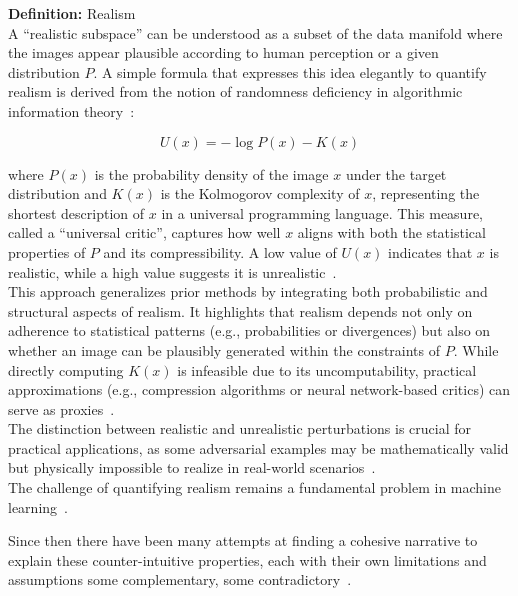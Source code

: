 \documentclass[a4paper, oneside]{discothesis}
\begin{document}
\begin{highlightbox}
	\textbf{Definition:} Realism  \\

	A ``realistic subspace'' can be understood as a subset of the data manifold where the images appear plausible according to human perception or a given distribution $P$. A simple formula that expresses this idea elegantly to quantify realism is derived from the notion of randomness deficiency in algorithmic information theory~\cite{theis2024makes}:

	$$U(x) = -\log P(x) - K(x)$$

	where $P(x)$ is the probability density of the image $x$ under the target distribution and $K(x)$ is the Kolmogorov complexity of $x$, representing the shortest description of $x$ in a universal programming language. This measure, called a ``universal critic'', captures how well $x$ aligns with both the statistical properties of $P$ and its compressibility. A low value of $U(x)$ indicates that $x$ is realistic, while a high value suggests it is unrealistic~\cite{theis2024makes}. \\

	This approach generalizes prior methods by integrating both probabilistic and structural aspects of realism. It highlights that realism depends not only on adherence to statistical patterns (e.g., probabilities or divergences) but also on whether an image can be plausibly generated within the constraints of $P$. While directly computing $K(x)$ is infeasible due to its uncomputability, practical approximations (e.g., compression algorithms or neural network-based critics) can serve as proxies~\cite{theis2024makes}. \\

	The distinction between realistic and unrealistic perturbations is crucial for practical applications, as some adversarial examples may be mathematically valid but physically impossible to realize in real-world scenarios~\cite{dyrmishi2023empirical}. \\
	
	The challenge of quantifying realism remains a fundamental problem in machine learning~\cite{theis2024makes}.
\end{highlightbox}

Since then there have been many attempts at finding a cohesive narrative to explain these counter-intuitive properties, each with their own limitations and assumptions \textendash{} some complementary, some contradictory~\cite{ilyas2019adversarial}.
\end{document}
